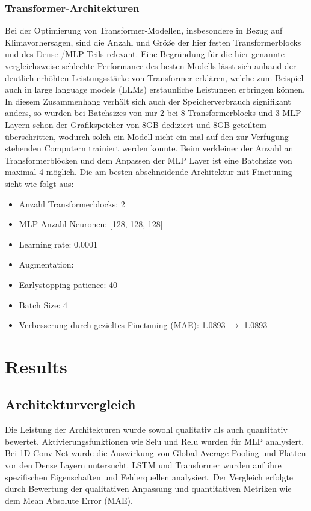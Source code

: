 \documentclass[manuscript,screen,review]{acmart}
\begin{document}
\subsubsection*{Transformer-Architekturen}
Bei der Optimierung von Transformer-Modellen, insbesondere in Bezug auf Klimavorhersagen, sind die Anzahl und Größe der hier festen Transformerblocks und des \textcolor{gray}{Dense-/}MLP-Teils relevant.
Eine Begründung für die hier genannte vergleichsweise schlechte Performance des besten Modells lässt sich anhand der deutlich erhöhten Leistungsstärke von Transformer erklären, welche zum Beispiel auch in large language models (LLMs) erstaunliche Leistungen erbringen können.
In diesem Zusammenhang verhält sich auch der Speicherverbrauch signifikant anders, so wurden bei Batchsizes von nur 2 bei 8 Transformerblocks und 3 MLP Layern schon der Grafikspeicher von 8GB dediziert und 8GB geteiltem überschritten, wodurch solch ein Modell nicht ein mal auf den zur Verfügung stehenden Computern trainiert werden konnte. Beim verkleiner der Anzahl an Transformerblöcken und dem Anpassen der MLP Layer ist eine Batchsize von maximal 4 möglich.
Die am besten abschneidende Architektur mit Finetuning sieht wie folgt aus:
\begin{itemize}
    \item Anzahl Transformerblocks: 2
    \item MLP Anzahl Neuronen: [128, 128, 128]
    \item Learning rate: 0.0001
    \item Augmentation: 
    \item Earlystopping patience: 40
    \item Batch Size: 4
    \item Verbesserung durch gezieltes Finetuning (MAE): 1.0893 $\rightarrow$ 1.0893
\end{itemize}

\section{Results}

\subsection{Architekturvergleich}
Die Leistung der Architekturen wurde sowohl qualitativ als auch quantitativ bewertet. Aktivierungsfunktionen wie Selu und Relu wurden für MLP analysiert. Bei 1D Conv Net wurde die Auswirkung von Global Average Pooling und Flatten vor den Dense Layern untersucht. LSTM und Transformer wurden auf ihre spezifischen Eigenschaften und Fehlerquellen analysiert. Der Vergleich erfolgte durch Bewertung der qualitativen Anpassung und quantitativen Metriken wie dem Mean Absolute Error (MAE).
\end{document}
